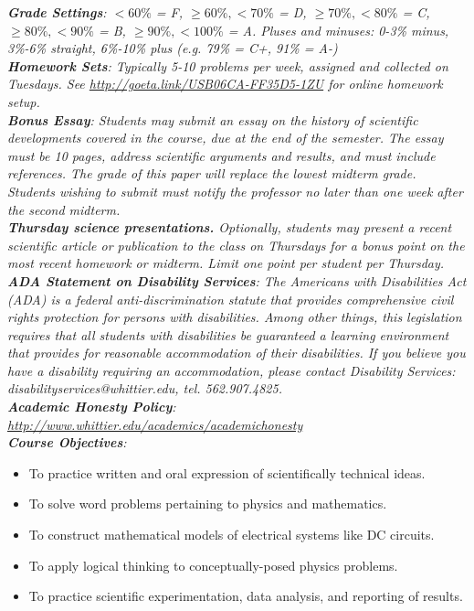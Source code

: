\documentclass[10pt]{article}
\begin{document}
\textit{\textbf{Grade Settings}: $<60\%$ = F, $\geq 60\%, <70\%$ = D, $\geq 70\%, <80\%$ = C, $\geq 80\%, <90\%$ = B, $\geq 90\%, <100\%$ = A.  Pluses and minuses: 0-3\% minus, 3\%-6\% straight, 6\%-10\% plus (e.g. 79\% = C+, 91\% = A-)} \\
\textit{\textbf{Homework Sets}: Typically 5-10 problems per week, assigned and collected on Tuesdays.  See \url{http://goeta.link/USB06CA-FF35D5-1ZU} for online homework setup.} \\
\textit{\textbf{Bonus Essay}: Students may submit an essay on the history of scientific developments covered in the course, due at the end of the semester. The essay must be 10 pages, address scientific arguments and results, and must include references. The grade of this paper will replace the lowest midterm grade. Students wishing to submit must notify the professor no later than one week after the second midterm.} \\
\textit{\textbf{Thursday science presentations.} Optionally, students may present a recent scientific article or publication to the class on Thursdays for a bonus point on the most recent homework or midterm. Limit one point per student per Thursday.} \\
\textit{\textbf{ADA Statement on Disability Services}: The Americans with Disabilities Act (ADA) is a federal anti-discrimination statute that provides comprehensive civil rights protection for persons with disabilities. Among other things, this legislation requires that all students with disabilities be guaranteed a learning environment that provides for reasonable accommodation of their disabilities. If you believe you have a disability requiring an accommodation, please contact Disability Services: disabilityservices@whittier.edu, tel. 562.907.4825.} \\
\textit{\textbf{Academic Honesty Policy}: \url{http://www.whittier.edu/academics/academichonesty}} \\
\textit{\textbf{Course Objectives}:}
\begin{itemize}
\item To practice written and oral expression of scientifically technical ideas.
\item To solve word problems pertaining to physics and mathematics.
\item To construct mathematical models of electrical systems like DC circuits.
\item To apply logical thinking to conceptually-posed physics problems.
\item To practice scientific experimentation, data analysis, and reporting of results.
\end{itemize}
\end{document}
